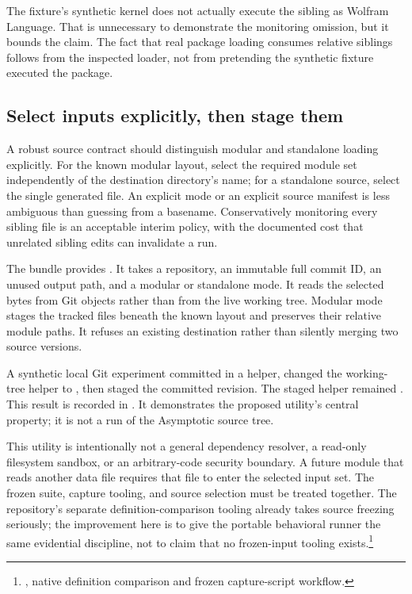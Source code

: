 \documentclass[11pt,letterpaper]{article}
\newcommand{\code}[1]{\texttt{\detokenize{#1}}}
\newcommand{\src}[2]{\footnote{\cite{#1}, #2.}}
\begin{document}
The fixture's synthetic kernel does not actually execute the sibling as Wolfram Language. That is unnecessary to demonstrate the monitoring omission, but it bounds the claim. The fact that real package loading consumes relative siblings follows from the inspected loader, not from pretending the synthetic fixture executed the package.

\subsection{Select inputs explicitly, then stage them}

A robust source contract should distinguish modular and standalone loading explicitly. For the known modular layout, select the required module set independently of the destination directory's name; for a standalone source, select the single generated file. An explicit mode or an explicit source manifest is less ambiguous than guessing from a basename. Conservatively monitoring every sibling \code{.wl} file is an acceptable interim policy, with the documented cost that unrelated sibling edits can invalidate a run.

The bundle provides . It takes a repository, an immutable full commit ID, an unused output path, and a modular or standalone mode. It reads the selected bytes from Git objects rather than from the live working tree. Modular mode stages the tracked \code{.wl} files beneath the known  layout and preserves their relative module paths. It refuses an existing destination rather than silently merging two source versions.

A synthetic local Git experiment committed \code{value=1;} in a helper, changed the working-tree helper to \code{value=999;}, then staged the committed revision. The staged helper remained \code{value=1;}. This result is recorded in . It demonstrates the proposed utility's central property; it is not a run of the Asymptotic source tree.

This utility is intentionally not a general dependency resolver, a read-only filesystem sandbox, or an arbitrary-code security boundary. A future module that reads another data file requires that file to enter the selected input set. The frozen suite, capture tooling, and source selection must be treated together. The repository's separate definition-comparison tooling already takes source freezing seriously; the improvement here is to give the portable behavioral runner the same evidential discipline, not to claim that no frozen-input tooling exists.\src{compat}{native definition comparison and frozen capture-script workflow}
\end{document}
